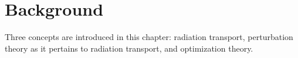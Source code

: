\chapter{Background}
\label{chap:bg}

Three concepts are introduced in this chapter: radiation transport, perturbation theory as it pertains to radiation transport, and optimization theory.




